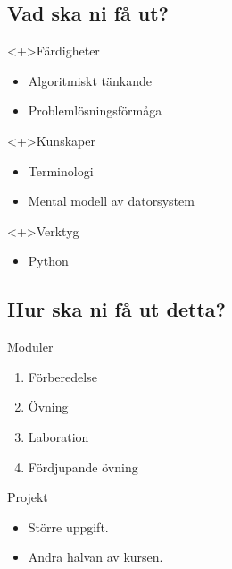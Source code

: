 \subsection{Vad ska ni få ut?}

\begin{frame}
  \begin{block}<+>{Färdigheter}
    \begin{itemize}
      \item Algoritmiskt tänkande
      \item Problemlösningsförmåga
    \end{itemize}
  \end{block}

  \begin{block}<+>{Kunskaper}
    \begin{itemize}
      \item Terminologi
      \item Mental modell av datorsystem
    \end{itemize}
  \end{block}

  \begin{block}<+>{Verktyg}
    \begin{itemize}
      \item Python
    \end{itemize}
  \end{block}
\end{frame}

\subsection{Hur ska ni få ut detta?}

\begin{frame}
  \begin{block}{Moduler}
    \begin{enumerate}
      \item Förberedelse
      \item Övning
      \item Laboration
      \item Fördjupande övning
    \end{enumerate}
  \end{block}

  \pause

  \begin{block}{Projekt}
    \begin{itemize}
      \item Större uppgift.
      \item Andra halvan av kursen.
    \end{itemize}
  \end{block}
\end{frame}

